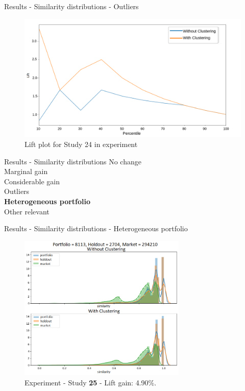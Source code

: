 
\begin{frame}{Results - Similarity distributions - Outliers}
    \begin{figure}
       \centering
       \includegraphics[width=\linewidth]{fig/ch4-outlier-study-24-lift-exp-2.png}
       \caption{Lift plot for Study 24 in experiment \nameExperimentII{}}
    \end{figure}
\end{frame}


\begin{frame}{Results - Similarity distributions}
    No change \\ 
    \vspace{0.5cm}
    Marginal gain \\
    \vspace{0.5cm}
    Considerable gain \\
    \vspace{0.5cm}
    Outliers \\
    \vspace{0.5cm}
    \textbf{Heterogeneous portfolio} \\
    \vspace{0.5cm}
    Other relevant 
\end{frame}


\begin{frame}{Results - Similarity distributions - Heterogeneous portfolio}
    \begin{figure}
       \centering
       \includegraphics[width=8cm]{fig/ch4-bump-study-25.png}
       \caption{Experiment \nameExperimentII{} - Study \textbf{25} - Lift gain: \colorbox{lgreen}{4.90\%.}}
    \end{figure}
\end{frame}

